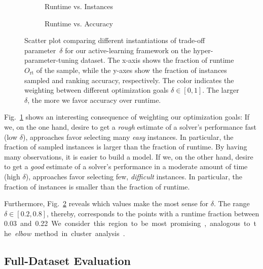 \documentclass[sn-basic, Numbered]{sn-jnl} %
\begin{document}
\begin{figure}[tb!]
  \centering
  \begin{subfigure}{0.4775\textwidth}
    \caption{Runtime vs. Instances}
    \label{fig:annitrainoptgoalruntime}
  \end{subfigure}
  \begin{subfigure}{0.5125\textwidth}
    \caption{Runtime vs. Accuracy}
    \label{fig:annitrainoptgoalacc}
  \end{subfigure}

  \caption{
    Scatter plot comparing different instantiations of trade-off parameter~$\delta$ for our active-learning framework on the hyper-parameter-tuning dataset.
    The x-axis shows the fraction of runtime $O_{\operatorname{rt}}$ of the sample, while the y-axes show the fraction of instances sampled and ranking accuracy, respectively.
    The color indicates the weighting between different optimization goals $\delta \in \left[0, 1\right]$.
    The larger $\delta$, the more we favor accuracy over runtime.
  }
  \label{fig:annitrainoptgoal}
\end{figure}

Fig.~\ref{fig:annitrainoptgoalruntime} shows an interesting consequence of weighting our optimization goals:
If we, on the one hand, desire to get a \emph{rough} estimate of a solver's performance fast (low $\delta$), approaches favor selecting many \emph{easy} instances.
In particular, the fraction of sampled instances is larger than the fraction of runtime.
By having many observations, it is easier to build a model.
If we, on the other hand, desire to get a \emph{good} estimate of a solver's performance in a moderate amount of time (high $\delta$), approaches favor selecting few, \emph{difficult} instances.
In particular, the fraction of instances is smaller than the fraction of runtime.

Furthermore, Fig.~\ref{fig:annitrainoptgoalacc} reveals which values make the most sense for $\delta$.
The range $\delta \in \left[0.2, 0.8\right]$, thereby, corresponds to the points with a runtime fraction between \SI{0.03} and \SI{0.22}.
We consider this region to be most promising, analogous to the \emph{elbow} method in cluster analysis~\cite{kodinariya2013review}.

\subsection{Full-Dataset Evaluation}
\end{document}
